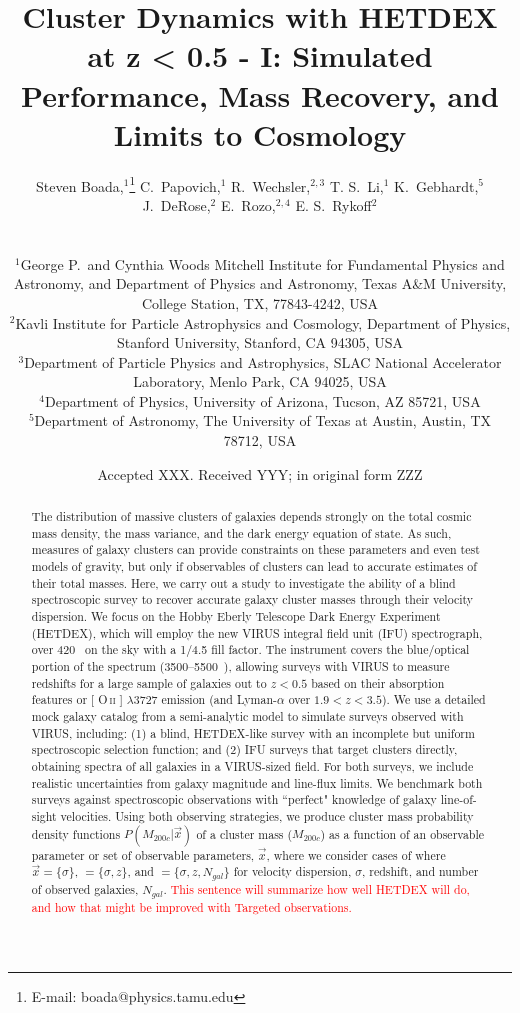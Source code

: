 \documentclass[fleqn,usenatbib]{mnras}
\title[Galaxy Clusters with HETDEX]{Cluster Dynamics with HETDEX at z < 0.5 - I: Simulated Performance, Mass Recovery, and Limits to Cosmology}
\author[S. Boada et al.]
{\parbox{\textwidth}{Steven Boada,$^{1}$\thanks{E-mail: boada@physics.tamu.edu}
C.~Papovich,$^{1}$
R.~Wechsler,$^{2,3}$
T. S.~Li,$^{1}$
K.~Gebhardt,$^{5}$
J.~DeRose,$^{2}$
E.~Rozo,$^{2,4}$
E. S.~Rykoff$^{2}$}\vspace{0.4cm}\
\\
\parbox{\textwidth}{$^{1}$George P.\ and Cynthia Woods Mitchell Institute for Fundamental Physics and Astronomy, and Department of Physics and Astronomy, Texas A\&M University, College Station, TX, 77843-4242, USA\\
$^{2}$Kavli Institute for Particle Astrophysics and Cosmology, Department of Physics, Stanford University, Stanford, CA 94305, USA\\
$^{3}$Department of Particle Physics and Astrophysics, SLAC National Accelerator Laboratory, Menlo Park, CA 94025, USA\\
$^{4}$Department of Physics, University of Arizona, Tucson, AZ 85721, USA\\
$^{5}$Department of Astronomy, The University of Texas at Austin, Austin, TX 78712, USA}}
\date{Accepted XXX. Received YYY; in original form ZZZ}
\makeatletter
\newcommand{\editorial}[1]{\textcolor{red}{#1}}
\DeclareRobustCommand{\ion}[2]{%
\relax\ifmmode
\ifx\testbx\f@series
{\mathbf{#1\,\mathsc{#2}}}\else
{\mathrm{#1\,\mathsc{#2}}}\fi
\else\textup{#1\,{\mdseries\textsc{#2}}}%
\fi}
\makeatother
\begin{document}
\label{firstpage}
\pagerange{\pageref{firstpage}--\pageref{lastpage}}
\maketitle

\begin{abstract}
\noindent
The distribution of massive clusters of galaxies depends strongly on the total cosmic mass density, the mass variance, and the dark energy equation of state. As such, measures of galaxy clusters can provide constraints on these parameters and even test models of gravity, but only if observables of clusters can lead to accurate estimates of their total masses. Here, we carry out a study to investigate the ability of a blind spectroscopic survey to recover accurate galaxy cluster masses through their velocity dispersion. We focus on the Hobby Eberly Telescope Dark Energy Experiment (HETDEX), which will employ the new VIRUS integral field unit (IFU) spectrograph, over 420 \degsq\ on the sky with a 1/4.5 fill factor. The instrument covers the blue/optical portion of the spectrum (3500--5500~\AAA), allowing surveys with VIRUS to measure redshifts for a large sample of galaxies out to $z < 0.5$ based on their absorption features or [\ion{O}{ii}] $\lambda$3727 emission (and Lyman-$\alpha$ over $1.9 < z < 3.5$). We use a detailed mock galaxy catalog from a semi-analytic model to simulate surveys observed with VIRUS, including: (1) a blind, HETDEX-like survey with an incomplete but uniform spectroscopic selection function; and (2) IFU surveys that target clusters directly, obtaining spectra of all galaxies in a VIRUS-sized field. For both surveys, we include realistic uncertainties from galaxy magnitude and line-flux limits. We benchmark both surveys against spectroscopic observations with ``perfect" knowledge of galaxy line-of-sight velocities. Using both observing strategies, we produce cluster mass probability density functions $P(M_{200c}|\vec{x})$ of a cluster mass ($M_{200c}$) as a function of an observable parameter or set of observable parameters, $\vec{x}$, where we consider cases of where $\vec{x} = \{\sigma\}$, $=\{\sigma, z\}$, and $=\{\sigma,z, N_{gal}\}$ for velocity dispersion, $\sigma$, redshift, and number of observed galaxies, $N_{gal}$. \editorial{This sentence will summarize how well HETDEX will do, and how that might be improved with Targeted observations.}
\end{abstract}
\end{document}
